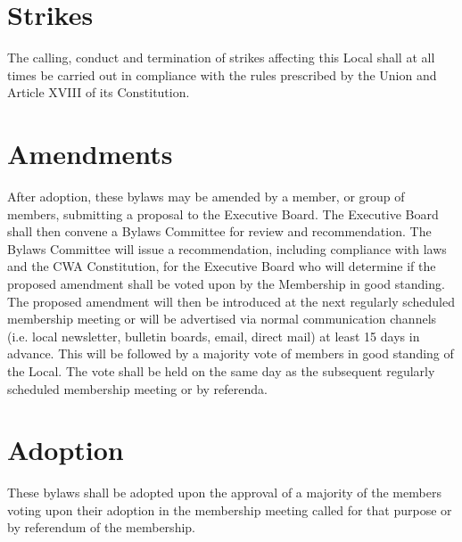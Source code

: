 \documentclass[12pt]{article}
\begin{document}
\section{Strikes}
The calling, conduct and termination of strikes affecting this Local shall at all times be carried out in compliance with the rules prescribed by the Union and Article XVIII of its Constitution.

\section{Amendments}\label{amendments}
After adoption, these bylaws may be amended by a member, or group of members, submitting a proposal to the Executive Board. The Executive Board shall then convene a Bylaws Committee for review and recommendation. The Bylaws Committee will issue a recommendation, including compliance with laws and the CWA Constitution, for the Executive Board who will determine if the proposed amendment shall be voted upon by the Membership in good standing. The proposed amendment will then be introduced at the next regularly scheduled membership meeting or will be advertised via normal communication channels (i.e. local newsletter, bulletin boards, email, direct mail) at least 15 days in advance. This will be followed by a majority vote of members in good standing of the Local. The vote shall be held on the same day as the subsequent regularly scheduled membership meeting or by referenda.

\section{Adoption}
These bylaws shall be adopted upon the approval of a majority of the members voting upon their adoption in the membership meeting called for that purpose or by referendum of the membership.
\end{document}
